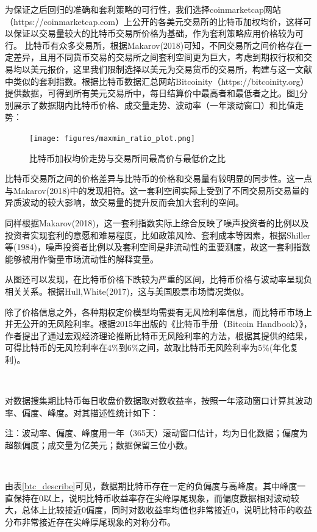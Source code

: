 \par{为保证之后回归的准确和套利策略的可行性，我们选择coinmarketcap网站（https://coinmarketcap.com）上公开的各美元交易所的比特币加权均价，这样可以保证以交易量较大的比特币交易所价格为基础，作为套利策略应用价格较为可行。
比特币有众多交易所，根据Makarov(2018)可知，不同交易所之间价格存在一定差异，且用不同货币交易的交易所之间套利空间更为巨大\cite{Makarov-2018}，考虑到期权行权和交易均以美元报价，这里我们限制选择以美元为交易货币的交易所，构建与这一文献中类似的套利指数。根据比特币数据汇总网站Bitcoinity（https://bitcoinity.org）提供数据，可得到所有美元交易所中，每日结算价中最高者和最低者之比。图\ref{maxmin_ratio}分别展示了数据期内比特币价格、成交量走势、波动率（一年滚动窗口）和比值走势：
\begin{figure}[H]
\begin{small}
    \begin{center}
        \texttt{[image: figures/maxmin\_ratio\_plot.png]} 
    \end{center}
    \caption{比特币加权均价走势与交易所间最高价与最低价之比}
    \label{maxmin_ratio}
\end{small}
\end{figure}
}
\par{比特币交易所之间的价格差异与比特币的价格和交易量有较明显的同步性。这一点与Makarov(2018)中的发现相符\cite{Makarov-2018}。这一套利空间实际上受到了不同交易所交易量的异质波动的较大影响，故交易量的提升反而会加大套利的空间。}
\par{同样根据Makarov(2018)，这一套利指数实际上综合反映了噪声投资者的比例以及投资者实现套利的意愿和难易程度，比如政策风险、套利成本等因素，根据Shiller等(1984)，噪声投资者比例以及套利空间是非流动性的重要测度，故这一套利指数能够被用作衡量市场流动性的解释变量。}
\par{从图\label{maxmin_ratio}还可以发现，在比特币价格下跌较为严重的区间，比特币价格与波动率呈现负相关关系。根据Hull,White(2017)，这与美国股票市场情况类似。}
\par{除了价格信息之外，各种期权定价模型均需要有无风险利率信息，而比特币市场上并无公开的无风险利率。根据2015年出版的《比特币手册（Bitcoin Handbook）》\cite{WESNER2015223}，作者提出了通过宏观经济理论推断比特币无风险利率的方法，根据其提供的结果，可得比特币的无风险利率在4$\%$到6$\%$之间，故取比特币无风险利率为5$\%$(年化复利)。
}

~\\
\par{
对数据搜集期比特币每日收盘价数据取对数收益率，按照一年滚动窗口计算其波动率、偏度、峰度。对其描述性统计如下：}
\begin{center}
\begin{threeparttable}[H]
    
    \centering
    \caption{比特币数据描述性统计}
    \label{btc_describe}
    
    \begin{tablenotes}
        \footnotesize
        \item 注：波动率、偏度、峰度用一年（365天）滚动窗口估计，均为日化数据；偏度为超额偏度；成交量为亿美元；数据保留三位小数。
    \end{tablenotes}
\end{threeparttable}
\end{center}

~\\
\par{
由表\ref{btc_describe}可见，数据期比特币存在一定的负偏度与高峰度。其中峰度一直保持在0以上，说明比特币收益率存在尖峰厚尾现象，而偏度数据相对波动较大，总体上比较接近0偏度，同时对数收益率均值也非常接近0，说明比特币的收益分布非常接近存在尖峰厚尾现象的对称分布。
}
